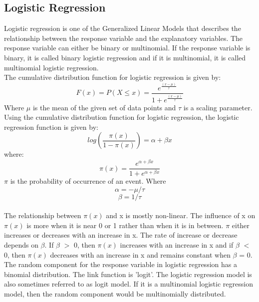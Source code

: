 \documentclass[sigconf]{acmart}
\begin{document}
\subsection{Logistic Regression}
Logistic regression is one of the Generalized Linear Models that describes the relationship between the response variable and the explanatory variables\cite{Agresti2007}. The response variable can either be binary or multinomial. If the response variable is binary, it is called binary logistic regression and if it is multinomial, it is called multinomial logistic regression. \\
The  cumulative distribution function for logistic regression is given by:\\
\cite{Agresti2007}
\begin{equation}
    F(x) = P(X \leq x) = \frac{e^{\frac{(x-\mu)}{\tau}}}{1+e^{\frac{(x-\mu)}{\tau}}}
\end{equation}
Where $\mu$ is the mean of the given set of data points and $\tau$ is a scaling parameter.\\
Using the cumulative distribution function for logistic regression\cite{Agresti2007}, the logistic regression function is given by:\\
\cite{Agresti2007}
\begin{equation}
    log(\frac{\pi(x)}{1-\pi(x)}) = \alpha + \beta x
\end{equation}
where:\\
\cite{Agresti2007}
\begin{equation}
    \pi(x) = \frac{e^{\alpha+\beta x }}{1+e^{\alpha+\beta x }}
\end{equation}
$\pi$ is the probability of occurrence of an event. Where\\
\cite{Agresti2007}
\begin{equation}
    \alpha = -\mu/\tau
\end{equation}
\begin{equation}
    \beta = 1/\tau
\end{equation}\\
The relationship between $\pi(x)$ and x is mostly non-linear. The influence of x on $\pi(x)$ is more when it is near 0 or 1 rather than when it is in between. $\pi$ either increases or decreases with an increase in x\cite{Agresti2007}. The rate of increase or decrease depends on $\beta$. If $\beta$ $>$ 0, then $\pi(x)$ increases with an increase in x and if $\beta$ $<$ 0, then $\pi(x)$ decreases with an increase in x and remains constant when $\beta$ = 0.\\
The random component for the response variable in logistic regression has a binomial distribution. The link function is 'logit'. The logistic regression model is also sometimes referred to as logit model. If it is a multinomial logistic regression model, then the random component would be multinomially distributed\cite{Agresti2007}.
\end{document}
